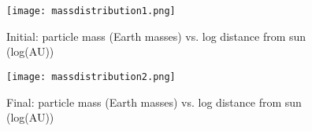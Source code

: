 \documentclass{article}
\begin{document}
\begin{figure} 
 \begin{center}
 \texttt{[image: massdistribution1.png]} 
 \caption{Initial: particle mass (Earth masses) vs. log distance from sun (log(AU))}
 \end{center}
\end{figure}

\begin{figure} 
 \begin{center}
 \texttt{[image: massdistribution2.png]} 
 \caption{Final: particle mass (Earth masses) vs. log distance from sun (log(AU))}
 \end{center}
\end{figure}
\end{document}
